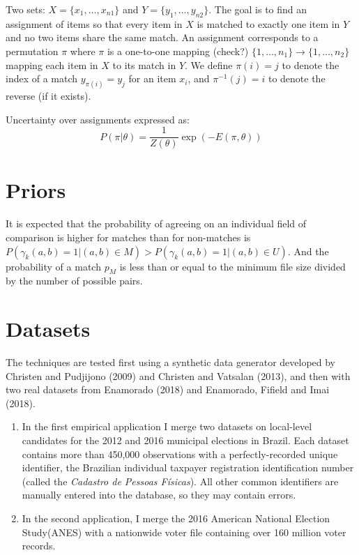 \documentclass[11pt,reqno]{amsart}
\begin{document}
Two sets: $X = \{x_1, \dots, x_{n1}\}$ and $Y = \{y_1, \dots, y_{n2}\}$. The goal is to find an assignment of items so that every item in $X$ is matched to exactly one item in $Y$ and no two items share the same match.  An assignment corresponds to a permutation $\pi$ where $\pi$ is a one-to-one mapping (check?) $\{1, \dots, n_1\} \to \{1, \dots, n_2\}$ mapping each item in $X$ to its match in $Y$.  We define $\pi(i) = j$ to denote the index of a match $y_{\pi(i)} = y_j$ for an item $x_i$, and $\pi^{-1}(j) = i$ to denote the reverse (if it exists). 

Uncertainty over assignments expressed as:
\[ P(\pi | \theta)  = \frac{1}{Z(\theta)} \exp(-E(\pi,\theta))\]


\section{Priors} 
It is expected that the probability of agreeing on an individual field of comparison is higher for matches than for non-matches is $P(\gamma_k(a,b) = 1 | (a,b) \in M) > P (\gamma_k(a, b) = 1 | (a,b) \in U) $.  And the probability of a match $p_M$ is less than or equal to the minimum file size divided by the number of possible pairs.  


\section{Datasets}
The techniques are tested first using a synthetic data generator developed by Christen and Pudjijono (2009) and Christen and Vatsalan (2013), and then with two real datasets from Enamorado (2018) and Enamorado, Fifield and Imai (2018). 
\begin{enumerate}
\item In the first empirical application I merge two datasets on local-level candidates for the 2012 and 2016 municipal elections in Brazil.  Each dataset contains more than 450,000 observations with a perfectly-recorded unique identifier, the Brazilian individual taxpayer registration identification number (called the \textit{Cadastro de Pessoas F\'isicas}).  All other common identifiers are manually entered into the database, so they may contain errors.  

\item In the second application, I merge the 2016 American National Election Study(ANES) with a nationwide voter file containing over 160 million voter records.  
\end{enumerate}
\end{document}

